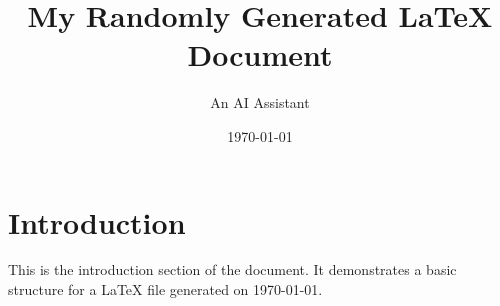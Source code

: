 \documentclass{article}
\title{My Randomly Generated LaTeX Document}
\author{An AI Assistant}
\date{\today}
\begin{document}
\maketitle

\section{Introduction}
This is the introduction section of the document. It demonstrates a basic structure for a LaTeX file generated on \today.
\end{document}
